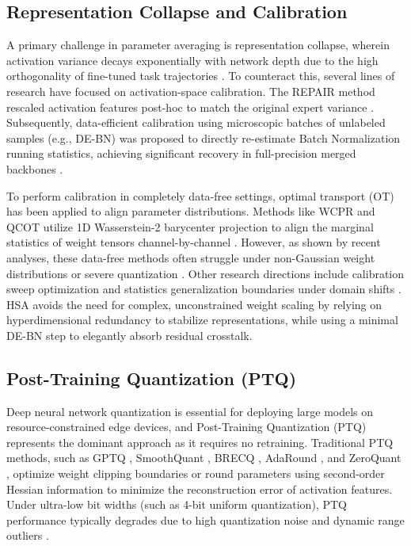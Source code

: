 \documentclass{article}
\theoremstyle{plain}
\theoremstyle{definition}
\theoremstyle{remark}
\begin{document}
\subsection{Representation Collapse and Calibration}
A primary challenge in parameter averaging is representation collapse, wherein activation variance decays exponentially with network depth due to the high orthogonality of fine-tuned task trajectories \cite{jordan2023repair}. To counteract this, several lines of research have focused on activation-space calibration. The REPAIR method rescaled activation features post-hoc to match the original expert variance \cite{jordan2023repair}. Subsequently, data-efficient calibration using microscopic batches of unlabeled samples (e.g., DE-BN) was proposed to directly re-estimate Batch Normalization running statistics, achieving significant recovery in full-precision merged backbones \cite{anonymous2026a, Nado2020EvaluatingPB, Gao2022BatchNF}. 

To perform calibration in completely data-free settings, optimal transport (OT) has been applied to align parameter distributions. Methods like WCPR and QCOT utilize 1D Wasserstein-2 barycenter projection to align the marginal statistics of weight tensors channel-by-channel \cite{anonymous2026c, Corbeil2025AMA}. However, as shown by recent analyses, these data-free methods often struggle under non-Gaussian weight distributions or severe quantization \cite{anonymous2026b}. Other research directions include calibration sweep optimization \cite{Zhang2023OptimizingHI} and statistics generalization boundaries under domain shifts \cite{Langenkamp2026ImpactOD}. HSA avoids the need for complex, unconstrained weight scaling by relying on hyperdimensional redundancy to stabilize representations, while using a minimal DE-BN step to elegantly absorb residual crosstalk.

\subsection{Post-Training Quantization (PTQ)}
Deep neural network quantization is essential for deploying large models on resource-constrained edge devices, and Post-Training Quantization (PTQ) represents the dominant approach as it requires no retraining. Traditional PTQ methods, such as GPTQ \cite{Frantar2022GPTQAP}, SmoothQuant \cite{Xiao2022SmoothQuantAA}, BRECQ \cite{Li2021BRECQPT}, AdaRound \cite{Nagel2020UpOD}, and ZeroQuant \cite{Yao2022ZeroQuantEA}, optimize weight clipping boundaries or round parameters using second-order Hessian information to minimize the reconstruction error of activation features. Under ultra-low bit widths (such as 4-bit uniform quantization), PTQ performance typically degrades due to high quantization noise and dynamic range outliers \cite{Frantar2022OptimalBC, Huang2024BiLLMPT, Shang2022PostTrainingQO, Wei2022QDropRD, Liu2021PostTrainingQF}.
\end{document}
